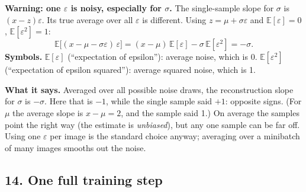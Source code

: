\textbf{Warning: one $\varepsilon$ is noisy, especially for $\sigma$.} The single-sample slope for $\sigma$ is $(x - z)\varepsilon$. Its true average over all $\varepsilon$ is different. Using $z = \mu + \sigma\varepsilon$ and $\mathbb{E}[\varepsilon] = 0$, $\mathbb{E}[\varepsilon^2] = 1$:
\[
\mathbb{E}\big[(x - \mu - \sigma\varepsilon)\,\varepsilon\big] = (x - \mu)\,\mathbb{E}[\varepsilon] - \sigma\,\mathbb{E}[\varepsilon^2] = -\sigma.
\]
\textbf{Symbols.} $\mathbb{E}[\varepsilon]$ (``expectation of epsilon''): average noise, which is 0. $\mathbb{E}[\varepsilon^2]$ (``expectation of epsilon squared''): average squared noise, which is 1.

\textbf{What it says.} Averaged over all possible noise draws, the reconstruction slope for $\sigma$ is $-\sigma$. Here that is $-1$, while the single sample said $+1$: opposite signs. (For $\mu$ the average slope is $x - \mu = 2$, and the sample said 1.) On average the samples point the right way (the estimate is \emph{unbiased}), but any one sample can be far off. Using one $\varepsilon$ per image is the standard choice anyway; averaging over a minibatch of many images smooths out the noise.

\subsection*{14. One full training step}

